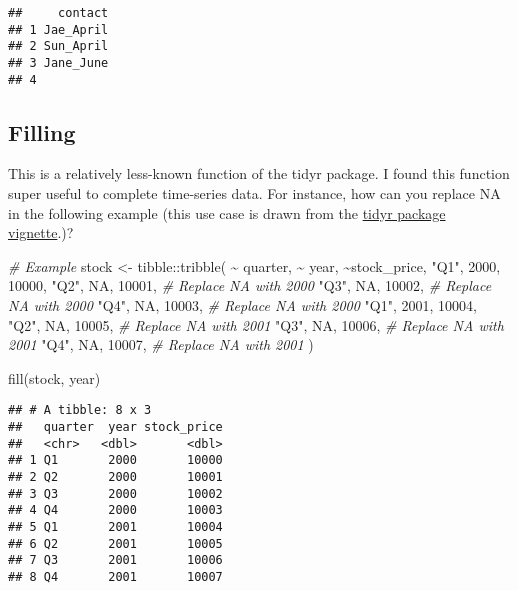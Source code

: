 \documentclass[
]{book}
\newenvironment{Shaded}{\begin{snugshade}}{\end{snugshade}}
\newcommand{\CommentTok}[1]{\textcolor[rgb]{0.56,0.35,0.01}{\textit{#1}}}
\newcommand{\ConstantTok}[1]{\textcolor[rgb]{0.00,0.00,0.00}{#1}}
\newcommand{\DecValTok}[1]{\textcolor[rgb]{0.00,0.00,0.81}{#1}}
\newcommand{\FunctionTok}[1]{\textcolor[rgb]{0.00,0.00,0.00}{#1}}
\newcommand{\NormalTok}[1]{#1}
\newcommand{\OtherTok}[1]{\textcolor[rgb]{0.56,0.35,0.01}{#1}}
\newcommand{\SpecialCharTok}[1]{\textcolor[rgb]{0.00,0.00,0.00}{#1}}
\newcommand{\StringTok}[1]{\textcolor[rgb]{0.31,0.60,0.02}{#1}}
\begin{document}
\begin{verbatim}
##     contact
## 1 Jae_April
## 2 Sun_April
## 3 Jane_June
## 4
\end{verbatim}

\hypertarget{filling}{%
\subsection{Filling}\label{filling}}

This is a relatively less-known function of the tidyr package. I found this function super useful to complete time-series data. For instance, how can you replace NA in the following example (this use case is drawn from the \href{https://tidyr.tidyverse.org/reference/fill.html}{tidyr package vignette}.)?

\begin{Shaded}
\begin{Highlighting}[]
\CommentTok{\# Example }
\NormalTok{stock }\OtherTok{\textless{}{-}}\NormalTok{ tibble}\SpecialCharTok{::}\FunctionTok{tribble}\NormalTok{(}
  \SpecialCharTok{\textasciitilde{}}\NormalTok{ quarter, }\SpecialCharTok{\textasciitilde{}}\NormalTok{ year, }\SpecialCharTok{\textasciitilde{}}\NormalTok{stock\_price, }
  \StringTok{"Q1"}\NormalTok{, }\DecValTok{2000}\NormalTok{, }\DecValTok{10000}\NormalTok{, }
  \StringTok{"Q2"}\NormalTok{, }\ConstantTok{NA}\NormalTok{, }\DecValTok{10001}\NormalTok{, }\CommentTok{\# Replace NA with 2000  }
  \StringTok{"Q3"}\NormalTok{, }\ConstantTok{NA}\NormalTok{, }\DecValTok{10002}\NormalTok{, }\CommentTok{\# Replace NA with 2000 }
  \StringTok{"Q4"}\NormalTok{, }\ConstantTok{NA}\NormalTok{, }\DecValTok{10003}\NormalTok{, }\CommentTok{\# Replace NA with 2000 }
  \StringTok{"Q1"}\NormalTok{, }\DecValTok{2001}\NormalTok{, }\DecValTok{10004}\NormalTok{, }
  \StringTok{"Q2"}\NormalTok{, }\ConstantTok{NA}\NormalTok{, }\DecValTok{10005}\NormalTok{, }\CommentTok{\# Replace NA with 2001 }
  \StringTok{"Q3"}\NormalTok{, }\ConstantTok{NA}\NormalTok{, }\DecValTok{10006}\NormalTok{, }\CommentTok{\# Replace NA with 2001 }
  \StringTok{"Q4"}\NormalTok{, }\ConstantTok{NA}\NormalTok{, }\DecValTok{10007}\NormalTok{, }\CommentTok{\# Replace NA with 2001}
\NormalTok{)}

\FunctionTok{fill}\NormalTok{(stock, year)}
\end{Highlighting}
\end{Shaded}

\begin{verbatim}
## # A tibble: 8 x 3
##   quarter  year stock_price
##   <chr>   <dbl>       <dbl>
## 1 Q1       2000       10000
## 2 Q2       2000       10001
## 3 Q3       2000       10002
## 4 Q4       2000       10003
## 5 Q1       2001       10004
## 6 Q2       2001       10005
## 7 Q3       2001       10006
## 8 Q4       2001       10007
\end{verbatim}
\end{document}
